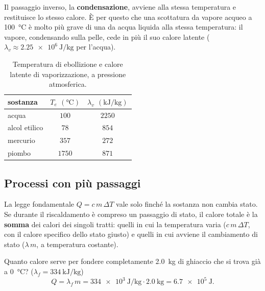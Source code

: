 Il passaggio inverso, la \textbf{condensazione}, avviene alla stessa temperatura e restituisce lo stesso calore. È per questo che una scottatura da vapore acqueo a \SI{100}{\celsius} è molto più grave di una da acqua liquida alla stessa temperatura: il vapore, condensando sulla pelle, cede in più il suo calore latente ($\lambda_v \approx \SI{2,25e6}{\joule\per\kilogram}$ per l'acqua).

\begin{table}[!htbp]
    \centering
    \begin{tabular}{lcc}
        \toprule
        sostanza & $T_e$ $(\si{\celsius})$ & $\lambda_v$ $(\si{\kilo\joule\per\kilogram})$ \\
        \midrule
        acqua & $100$ & $2250$ \\
        alcol etilico & $78$ & $854$ \\
        mercurio & $357$ & $272$ \\
        piombo & $1750$ & $871$ \\
        \bottomrule
    \end{tabular}
    \caption{Temperatura di ebollizione e calore latente di vaporizzazione, a pressione atmosferica.}
    \label{tab:latente-vaporizzazione}
\end{table}

\subsection{Processi con più passaggi}

La legge fondamentale $Q = c\,m\,\Delta T$ vale solo finché la sostanza non cambia stato. Se durante il riscaldamento è compreso un passaggio di stato, il calore totale è la \textbf{somma} dei calori dei singoli tratti: quelli in cui la temperatura varia ($c\,m\,\Delta T$, con il calore specifico dello stato giusto) e quelli in cui avviene il cambiamento di stato ($\lambda\,m$, a temperatura costante).

\begin{testexample}
Quanto calore serve per fondere completamente \SI{2,0}{\kilogram} di ghiaccio che si trova già a \SI{0}{\celsius}? ($\lambda_f = \SI{334}{\kilo\joule\per\kilogram}$)
\[ Q = \lambda_f\,m = \SI{334e3}{\joule\per\kilogram} \cdot \SI{2,0}{\kilogram} = \SI{6,7e5}{\joule}. \]
\end{testexample}

